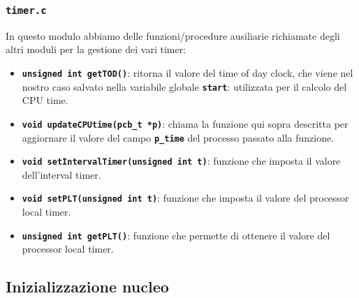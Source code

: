 \documentclass{article}
\begin{document}
	\subsubsection{\texttt{\textbf{timer.c}}}
	In questo modulo abbiamo delle funzioni/procedure ausiliarie richiamate degli altri
	moduli per la gestione dei vari timer:
	\begin{itemize}
		\item \texttt{\textbf{unsigned int getTOD()}}: ritorna il valore del time of
			day clock, che viene nel nostro caso salvato nella variabile globale
			\texttt{\textbf{start}}: utilizzata per il calcolo del CPU time.

		\item \texttt{\textbf{void updateCPUtime(pcb\_t *p)}}: chiama la funzione qui
			sopra descritta per aggiornare il valore del campo \texttt{\textbf{p\_time}}
			del processo passato alla funzione.

		\item \texttt{\textbf{void setIntervalTimer(unsigned int t)}}: funzione che imposta
			il valore dell'interval timer.

		\item \texttt{\textbf{void setPLT(unsigned int t)}}: funzione che imposta il
			valore del processor local timer.

		\item \texttt{\textbf{unsigned int getPLT()}}: funzione che permette di ottenere
			il valore del processor local timer.
	\end{itemize}

	\subsection{Inizializzazione nucleo}
\end{document}
